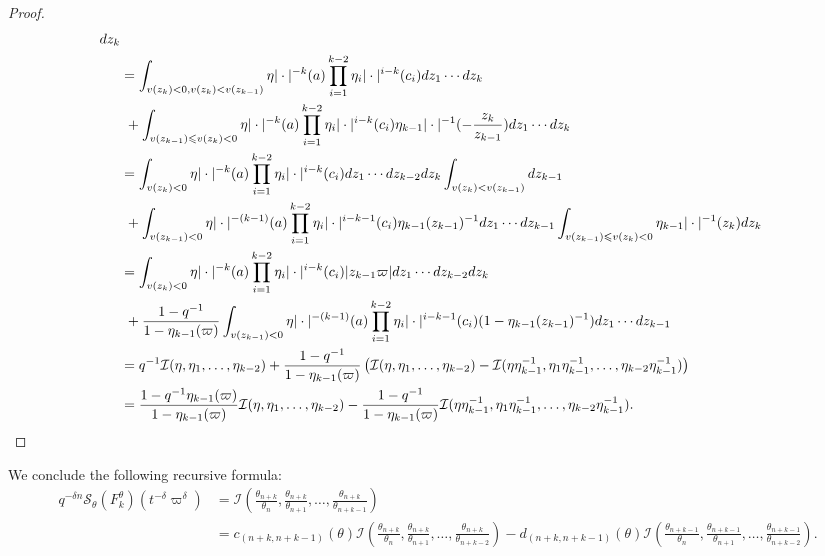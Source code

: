 \documentclass{amsart}
\theoremstyle{definition}
\begin{document}
{\begin{proof}
\begin{align*}
                                            dz_k\\
  &=\int_{v(z_k)<0,v(z_k)<v(z_{k-1})}\eta|\cdot|^{-k}(a)\prod_{i=1}^{k-2}\eta_i|\cdot|^{i-k}(c_i)dz_1\cdots
    dz_k\\
  &\ +\int_{v(z_{k-1})\leqslant v(z_k)<0}\eta|\cdot|^{-k}(a)\prod_{i=1}^{k-2}\eta_i|\cdot|^{i-k}(c_i) \eta_{k-1}|\cdot|^{-1}(-\frac{z_k}{z_{k-1}})dz_1\cdots
                                            dz_k\\
  &=\int_{v(z_k)<0}\eta|\cdot|^{-k}(a)\prod_{i=1}^{k-2}\eta_i|\cdot|^{i-k}(c_i)dz_1\cdots
    dz_{k-2}dz_k\int_{v(z_k)<v(z_{k-1})}dz_{k-1}\\
  &\ +\int_{v(z_{k-1})<0}\eta|\cdot|^{-(k-1)}(a)\prod_{i=1}^{k-2}\eta_i|\cdot|^{i-k-1}(c_i)\eta_{k-1}(z_{k-1})^{-1} dz_1\cdots dz_{k-1} \int_{v(z_{k-1})\leqslant v(z_k)<0}\eta_{k-1}|\cdot|^{-1}(z_k) dz_k\\
  &=\int_{v(z_k)<0}\eta|\cdot|^{-k}(a)\prod_{i=1}^{k-2}\eta_i|\cdot|^{i-k}(c_i)|z_{k-1}\varpi|dz_1\cdots
    dz_{k-2}dz_k\\
  &\ +\frac{1-q^{-1}}{1-\eta_{k-1}(\varpi)}\int_{v(z_{k-1})<0}\eta|\cdot|^{-(k-1)}(a)\prod_{i=1}^{k-2}\eta_i|\cdot|^{i-k-1}(c_i) (1-\eta_{k-1}(z_{k-1})^{-1})dz_1\cdots dz_{k-1}\\
  &=q^{-1}\mathcal{I}(\eta,\eta_1,\ldots,\eta_{k-2})
    +\frac{1-q^{-1}}{1-\eta_{k-1}(\varpi)}\left(\mathcal{I}(\eta,\eta_1,\ldots,\eta_{k-2})-\mathcal{I}(\eta\eta_{k-1}^{-1},\eta_1\eta_{k-1}^{-1},\ldots,\eta_{k-2}\eta_{k-1}^{-1})\right)\\
  &=\frac{1-q^{-1}\eta_{k-1}(\varpi)}{1-\eta_{k-1}(\varpi)}\mathcal{I}(\eta,\eta_1,\ldots,\eta_{k-2})-\frac{1-q^{-1}}{1-\eta_{k-1}(\varpi)}\mathcal{I}(\eta\eta_{k-1}^{-1},\eta_1\eta_{k-1}^{-1},\ldots,\eta_{k-2}\eta_{k-1}^{-1}).\qedhere 
\end{align*}
\end{proof}

We conclude the following recursive formula:
\begin{align*}
q^{-\delta n}\mathcal{S}_\theta(F^\theta_k)(t^{-\delta}\varpi^\delta )&=\mathcal{I}(\frac{\theta_{n+k}}{\theta_n},\frac{\theta_{n+k}}{\theta_{n+1}},\ldots,\frac{\theta_{n+k}}{\theta_{n+k-1}})\\
                                                                                       &=c_{(n+k,n+k-1)}(\theta)\mathcal{I}(\frac{\theta_{n+k}}{\theta_n},\frac{\theta_{n+k}}{\theta_{n+1}},\ldots,\frac{\theta_{n+k}}{\theta_{n+k-2}}) -d_{(n+k,n+k-1)}(\theta)\mathcal{I}(\frac{\theta_{n+k-1}}{\theta_n},\frac{\theta_{n+k-1}}{\theta_{n+1}},\ldots,\frac{\theta_{n+k-1}}{\theta_{n+k-2}}).
\end{align*}


}
\end{document}
